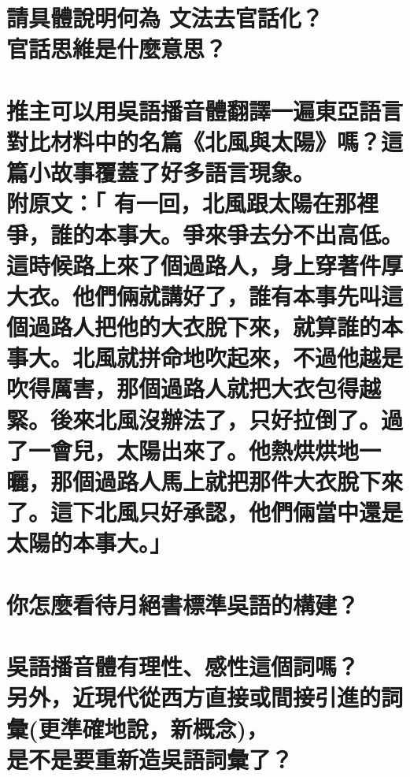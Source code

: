 \chapter[請具體說明何為 文法去官話化？ 官話思維是什麼意思？]{請具體說明何為 文法去官話化？ \\[0.35em] 官話思維是什麼意思？}

\chapter[推主可以用吳語播音體翻譯一遍東亞語言對比材料中的名篇《北風與太陽》嗎？這篇小故事覆蓋了好多語言現象。 附原文：「 有一回，北風跟太陽在那裡爭，誰的本事大。爭來爭去分不出高低。這時候路上來了個過路人，身上穿著件厚大衣。他們倆就講好了，誰有本事先叫這個過路人把他的大衣脫下來，就算誰的本事大。北風就拼命地吹起來，不過他越是吹得厲害，那個過路人就把大衣包得越緊。後來北風沒辦法了，只好拉倒了。過了一會兒，太陽出來了。他熱烘烘地一曬，那個過路人馬上就把那件大衣脫下來了。這下北風只好承認，他們倆當中還是太陽的本事大。」]{推主可以用吳語播音體翻譯一遍東亞語言對比材料中的名篇《北風與太陽》嗎？這篇小故事覆蓋了好多語言現象。 \\[0.35em] 附原文：「 有一回，北風跟太陽在那裡爭，誰的本事大。爭來爭去分不出高低。這時候路上來了個過路人，身上穿著件厚大衣。他們倆就講好了，誰有本事先叫這個過路人把他的大衣脫下來，就算誰的本事大。北風就拼命地吹起來，不過他越是吹得厲害，那個過路人就把大衣包得越緊。後來北風沒辦法了，只好拉倒了。過了一會兒，太陽出來了。他熱烘烘地一曬，那個過路人馬上就把那件大衣脫下來了。這下北風只好承認，他們倆當中還是太陽的本事大。」}

\chapter[你怎麼看待月絕書標準吳語的構建？]{你怎麼看待月絕書標準吳語的構建？}

\chapter[吳語播音體有理性、感性這個詞嗎？ 另外，近現代從西方直接或間接引進的詞彙(更準確地說，新概念)， 是不是要重新造吳語詞彙了？]{吳語播音體有理性、感性這個詞嗎？ \\[0.35em] 另外，近現代從西方直接或間接引進的詞彙(更準確地說，新概念)， \\[0.35em] 是不是要重新造吳語詞彙了？}

